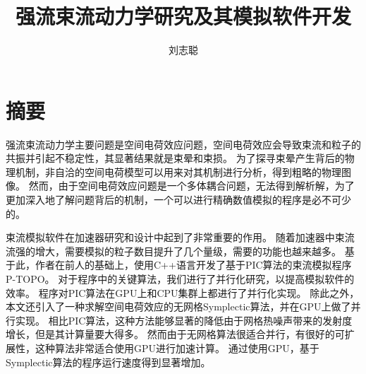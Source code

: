   \confidential{}%
  \title[强流束流动力学研究及其模拟软件开发]{强流束流动力学研究及其模拟软件开发}%
  \author{刘志聪}%
\maketitle
\makeenglishtitle
\makedeclaration
\chapter{摘\quad 要}%

强流束流动力学主要问题是空间电荷效应问题，空间电荷效应会导致束流和粒子的共振并引起不稳定性，其显著结果就是束晕和束损。
为了探寻束晕产生背后的物理机制，非自洽的空间电荷模型可以用来对其机制进行分析，得到粗略的物理图像。
然而，由于空间电荷效应问题是一个多体耦合问题，无法得到解析解，为了更加深入地了解问题背后的机制，一个可以进行精确数值模拟的程序是必不可少的。

束流模拟软件在加速器研究和设计中起到了非常重要的作用。
随着加速器中束流流强的增大，需要模拟的粒子数目提升了几个量级，需要的功能也越来越多。
基于此，作者在前人的基础上，使用C++语言开发了基于PIC算法的束流模拟程序P-TOPO。
对于程序中的关键算法，我们进行了并行化研究，以提高模拟软件的效率。
程序对PIC算法在GPU上和CPU集群上都进行了并行化实现。
除此之外，本文还引入了一种求解空间电荷效应的无网格Symplectic算法，并在GPU上做了并行实现。
相比PIC算法，这种方法能够显著的降低由于网格热噪声带来的发射度增长，但是其计算量要大得多。
然而由于无网格算法很适合并行，有很好的可扩展性，这种算法非常适合使用GPU进行加速计算。
通过使用GPU，基于Symplectic算法的程序运行速度得到显著增加。

